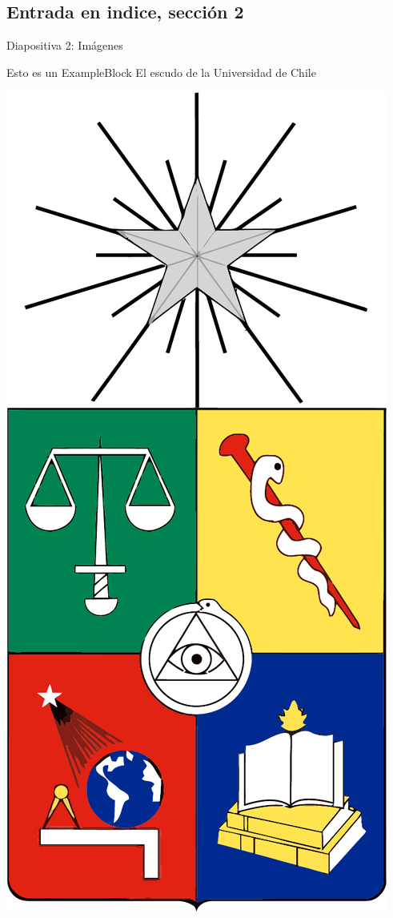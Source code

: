 \documentclass[10pt]{beamer}
\begin{document}
\subsection{Entrada en indice, sección 2 }

\begin{frame}{Diapositiva 2: Imágenes}

	\begin{exampleblock}{Esto es un ExampleBlock}
	El escudo de la Universidad de Chile\\
	
	\begin{center}
		\includegraphics[scale=0.08]{img/escudoU.pdf}

\end{center}
\end{exampleblock}
\end{frame}
\end{document}
